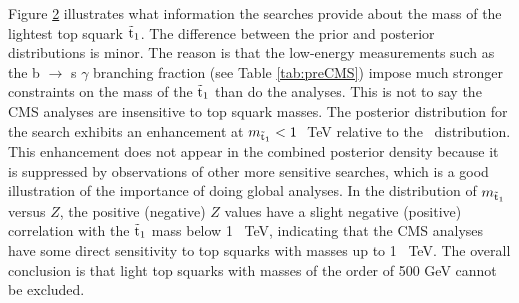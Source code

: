 \begin{figure}[t]
    \vspace{1mm}
    \caption{}
    \label{fig:mLCSP}
\end{figure}


Figure \ref{fig:mt1} illustrates what information the searches provide about the mass of the lightest top squark $\tilde{\text{t}}_1$.   
The difference between the prior and posterior distributions is minor. The reason is that the low-energy measurements such as 
 the b $\to$ s $\gamma$ branching fraction (see 
Table \ref{tab:preCMS}) impose much stronger constraints on the mass of the $\tilde{\text{t}}_1$ than do the analyses. 
This is not to say the CMS analyses are insensitive to top squark masses. The posterior distribution for the \MTtwo{} 
search exhibits an enhancement at $m_{\tilde{\text{t}}_1}<1~$ TeV relative to the \preCMS~distribution. This enhancement does not 
appear in the combined posterior density because it is suppressed by observations of other more sensitive searches, which is a good illustration of the importance of doing global analyses.  
 In the distribution of $m_{\tilde{\text{t}}_1}$ versus $Z$, the positive (negative) $Z$ values have a slight negative (positive) 
correlation with the $\tilde{\text{t}}_1$ mass below 1~ TeV, indicating that the CMS analyses have some 
direct sensitivity to top squarks with masses up to 1~ TeV. The overall conclusion is that light top squarks 
with masses of the order of 500 GeV cannot be excluded.
 
\begin{figure}[t]
    \vspace{1mm}
    \caption{}
    \label{fig:mt1}
\end{figure}

